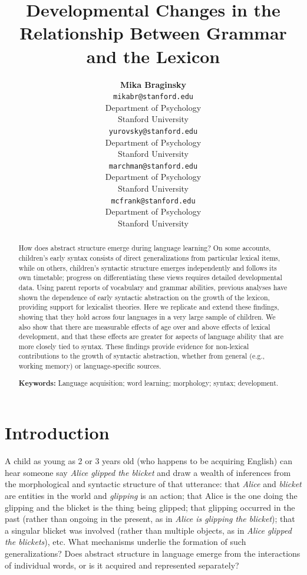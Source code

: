 \documentclass[10pt,letterpaper]{article}
\title{Developmental Changes in the Relationship Between Grammar and the Lexicon}
\author{{\large \bf Mika Braginsky} \\
  \texttt{mikabr@stanford.edu} \\
  Department of Psychology \\
  Stanford University
  \And {\large \bf Daniel Yurovsky} \\
  \texttt{yurovsky@stanford.edu} \\
  Department of Psychology \\
  Stanford University
    \And {\large \bf Virginia A. Marchman} \\
    \texttt{marchman@stanford.edu} \\
  Department of Psychology \\
  Stanford University
    \And {\large \bf Michael C. Frank}\\
    \texttt{mcfrank@stanford.edu} \\
  Department of Psychology \\
  Stanford University}
\begin{document}
\maketitle

\begin{abstract}

How does abstract structure emerge during language learning? On some accounts, children's early syntax consists of direct generalizations from particular lexical items, while on others, children's syntactic structure emerges independently and follows its own timetable; progress on differentiating these views requires detailed developmental data. Using parent reports of vocabulary and grammar abilities, previous analyses have shown the dependence of early syntactic abstraction on the growth of the lexicon, providing support for lexicalist theories. Here we replicate and extend these findings, showing that they hold across four languages in a very large sample of children. We also show that there are measurable effects of age over and above effects of lexical development, and that these effects are greater for aspects of language ability that are more closely tied to syntax. These findings provide evidence for non-lexical contributions to the growth of syntactic abstraction, whether from general (e.g., working memory) or language-specific sources.

\textbf{Keywords:} 
Language acquisition; word learning; morphology; syntax; development.
\end{abstract}

\section{Introduction}

A child as young as 2 or 3 years old (who happens to be acquiring English) can hear someone say \emph{Alice glipped the blicket} and draw a wealth of inferences from the morphological and syntactic structure of that utterance: that \emph{Alice} and \emph{blicket} are entities in the world and \emph{glipping} is an action; that Alice is the one doing the glipping and the blicket is the thing being glipped; that glipping occurred in the past (rather than ongoing in the present, as in \emph{Alice is glipping the blicket}); that a singular blicket was involved (rather than multiple objects, as in \emph{Alice glipped the blickets}), etc. What mechanisms underlie the formation of such generalizations? Does abstract structure in language emerge from the interactions of individual words, or is it acquired and represented separately?
\end{document}
